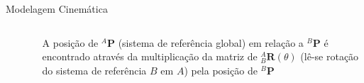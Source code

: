 \documentclass{beamer}
\begin{document}
\begin{frame}[t]{Modelagem Cinemática}
\begin{itemize}
\begin{columns}
\begin{column}[c]{0.5\textwidth}
\begin{figure}[!ht]
                \end{figure}
            \end{column}
            \begin{column}[c]{0.5\textwidth}
                A posição de ${}^A\mathbf{P}$ (sistema de referência global) em relação a ${}^B\mathbf{P}$ é encontrado através da multiplicação da matriz de ${}_B^A \mathbf{R}(\theta)$ (lê-se rotação do sistema de referência $B$ em $A$) pela posição de ${}^B\mathbf{P}$
            \end{column}
        \end{columns}
    \end{itemize}
\end{frame}
\end{document}
